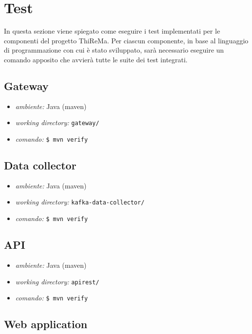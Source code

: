 \section{Test}
	In questa sezione viene spiegato come eseguire i test implementati per le componenti del progetto ThiReMa.
	Per ciascun componente, in base al linguaggio di programmazione con cui è stato sviluppato, sarà necessario eseguire un comando apposito che avvierà tutte le suite dei test integrati.

	\subsection{Gateway}
		
		\begin{itemize}
			\item \textit{ambiente:} Java (maven)
			\item \textit{working directory:} \verb!gateway/!
			\item \textit{comando:} \verb!$ mvn verify!
		\end{itemize}
		

	\subsection{Data collector}

		\begin{itemize}
			\item \textit{ambiente:} Java (maven)
			\item \textit{working directory:} \verb!kafka-data-collector/!
			\item \textit{comando:} \verb!$ mvn verify!
		\end{itemize}

	\subsection{API}

		\begin{itemize}
			\item \textit{ambiente:} Java (maven)
			\item \textit{working directory:} \verb!apirest/!
			\item \textit{comando:} \verb!$ mvn verify!
		\end{itemize}


	\subsection{Web application}

